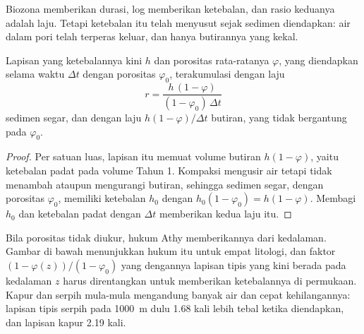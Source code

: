 Biozona memberikan durasi, log memberikan ketebalan, dan rasio keduanya adalah laju. Tetapi
ketebalan itu telah menyusut sejak sedimen diendapkan: air dalam pori telah terperas
keluar, dan hanya butirannya yang kekal.

\begin{proposition}\label{prop:b2:palaeoenvironments:rate}
Lapisan yang ketebalannya kini $h$ dan porositas rata-ratanya $\varphi$, yang diendapkan selama waktu $\Delta t$
dengan porositas $\varphi_0$, terakumulasi dengan laju
\[
  r = \frac{h\,(1 - \varphi)}{(1 - \varphi_0)\,\Delta t}
\]
sedimen segar, dan dengan laju $h(1-\varphi)/\Delta t$ butiran, yang tidak bergantung pada
$\varphi_0$.
\end{proposition}

\begin{proof}
Per satuan luas, lapisan itu memuat volume butiran $h(1 - \varphi)$, yaitu ketebalan padat pada
volume Tahun 1. Kompaksi mengusir air tetapi tidak menambah ataupun mengurangi butiran, sehingga sedimen
segar, dengan porositas $\varphi_0$, memiliki ketebalan $h_0$ dengan $h_0(1 - \varphi_0) = h(1 -
\varphi)$. Membagi $h_0$ dan ketebalan padat dengan $\Delta t$ memberikan kedua laju itu.
\end{proof}

Bila porositas tidak diukur, hukum Athy memberikannya dari kedalaman. Gambar di bawah menunjukkan
hukum itu untuk empat litologi, dan faktor $(1 - \varphi(z))/(1 - \varphi_0)$ yang dengannya lapisan
tipis yang kini berada pada kedalaman $z$ harus direntangkan untuk memberikan ketebalannya di permukaan. Kapur dan serpih
mula-mula mengandung banyak air dan cepat kehilangannya: lapisan tipis serpih pada \qty{1000}{m} dulu 1.68 kali
lebih tebal ketika diendapkan, dan lapisan kapur 2.19 kali.

